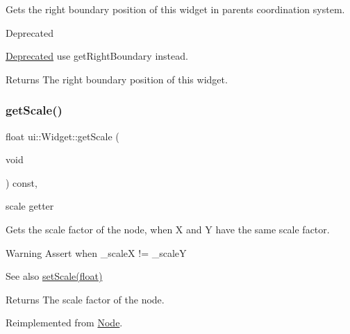 Gets the right boundary position of this widget in parent\textquotesingle{}s coordination system. \begin{DoxyRefDesc}{Deprecated}
\item[\hyperlink{deprecated__deprecated000405}{Deprecated}]use {\ttfamily get\+Right\+Boundary} instead. \end{DoxyRefDesc}
\begin{DoxyReturn}{Returns}
The right boundary position of this widget. 
\end{DoxyReturn}
\mbox{\label{classui_1_1Widget_ac4806c4d8ba815b1bb2a8f100527ab7b}} 
\subsubsection{\texorpdfstring{get\+Scale()}{getScale()}\hspace{0.1cm}{\footnotesize\ttfamily [1/2]}}
{\footnotesize\ttfamily float ui\+::\+Widget\+::get\+Scale (\begin{DoxyParamCaption}\item[{void}]{ }\end{DoxyParamCaption}) const\hspace{0.3cm}{\ttfamily [override]}, {\ttfamily [virtual]}}



scale getter 

Gets the scale factor of the node, when X and Y have the same scale factor.

\begin{DoxyWarning}{Warning}
Assert when {\ttfamily \+\_\+scaleX != \+\_\+scaleY} 
\end{DoxyWarning}
\begin{DoxySeeAlso}{See also}
\hyperlink{classui_1_1Widget_a811bffaa1d3bae377c00a15edccb396f}{set\+Scale(float)}
\end{DoxySeeAlso}
\begin{DoxyReturn}{Returns}
The scale factor of the node. 
\end{DoxyReturn}


Reimplemented from \hyperlink{classNode_ac9926440d4edab1020d348a2b950307c}{Node}.

\mbox{\label{classui_1_1Widget_a3decfabeeedb5fac08d9717f7c5421a3}} 
